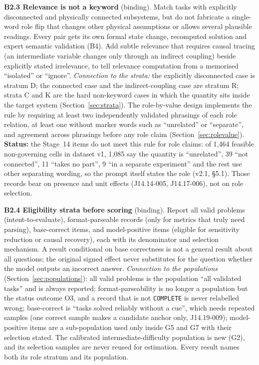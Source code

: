 \documentclass[10pt,a4paper]{article}
\begin{document}
\textbf{B2.3 Relevance is not a keyword} (binding). Match tasks with explicitly disconnected and physically
connected subsystems, but do not fabricate a single-word role flip that changes other physical assumptions or
allows several plausible readings. Every pair gets its own formal state change, recomputed solution and expert
semantic validation (B4). Add subtle relevance that requires causal tracing (an intermediate variable changes
only through an indirect coupling) beside explicitly stated irrelevance, to tell relevance computation from a
memorised ``isolated'' or ``ignore''. \emph{Connection to the strata:} the explicitly disconnected case is
stratum D; the connected case and the indirect-coupling case are stratum R; strata C and K are the hard
non-keyword cases in which the quantity sits inside the target system (Section~\ref{sec:strata}). The
role-by-value design implements the rule by requiring at least two independently validated phrasings of each role
relation, at least one without marker words such as ``unrelated'' or ``separate'', and agreement across phrasings
before any role claim (Section~\ref{sec:rolevalue}). \textbf{Status:} the Stage~14 items do not meet this rule for
role claims: of 1,464 feasible non-governing cells in dataset v1, 1,085 say the quantity is ``unrelated'', 39
``not connected'', 11 ``takes no part'', 9 ``in a separate experiment'' and the rest use other separating wording,
so the prompt itself states the role (v2.1, \S5.1). Those records bear on presence and unit effects
(J14.14-005, J14.17-006), not on role selection.

\textbf{B2.4 Eligibility strata before scoring} (binding). Report all valid problems (intent-to-evaluate),
format-parseable records (only for metrics that truly need parsing), base-correct items, and model-positive items
(eligible for sensitivity reduction or causal recovery), each with its denominator and selection mechanism. A
result conditional on base correctness is not a general result about all questions; the original signed effect
never substitutes for the question whether the model outputs an incorrect answer. \emph{Connection to the
populations} (Section~\ref{sec:populations}): all valid problems is the population ``all validated tasks'' and is
always reported; format-parseability is no longer a population but the status outcome O3, and a record that is not
\texttt{COMPLETE} is never relabelled wrong; base-correct is ``tasks solved reliably without a cue'', which needs
repeated samples (one correct sample makes a candidate anchor only, J14.19-009); model-positive items are a
sub-population used only inside G5 and G7 with their selection stated. The calibrated intermediate-difficulty
population is new (G2), and its selection samples are never reused for estimation. Every result names both its
role stratum and its population.
\end{document}
